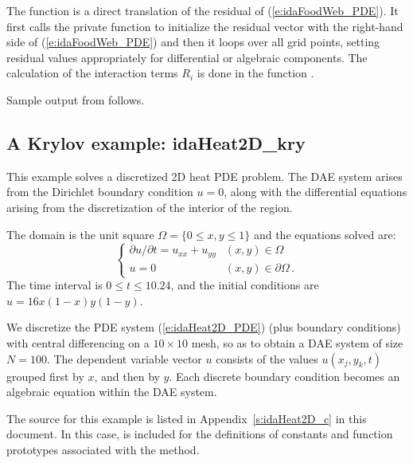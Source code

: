 The function  is a direct translation of the residual of
(\ref{e:idaFoodWeb_PDE}).  It first calls the private function  to
initialize the residual vector with the right-hand side of (\ref{e:idaFoodWeb_PDE})
and then it loops over all grid points, setting residual values appropriately for 
differential or algebraic components. The calculation of the interaction terms
$R_i$ is done in the function .


Sample output from  follows.


\subsection{A Krylov example: idaHeat2D\_kry}\label{ss:idaHeat2D}

This example solves a discretized 2D heat PDE problem. The DAE system
arises from the Dirichlet boundary condition $u = 0$, along with the 
differential equations arising from the discretization of the interior 
of the region. 

The domain is the unit square $\Omega = \{ 0 \le x,y \le 1 \}$ and the
equations solved are:
\begin{equation}\label{e:idaHeat2D_PDE}
\begin{cases}
  \partial u / \partial t = u_{xx} + u_{yy}  & (x,y) \in \Omega \\
  u = 0 & (x,y) \in \partial\Omega\, .
\end{cases}
\end{equation}
The time interval is $0 \leq t \leq 10.24$, and the initial conditions are 
$u = 16x(1-x)y(1-y)$.

We discretize the PDE system (\ref{e:idaHeat2D_PDE}) (plus boundary conditions)
with central differencing on a $10 \times 10$ mesh, so as to obtain a
DAE system of size $N = 100$.  The dependent variable vector $u$
consists of the values $u(x_j,y_k,t)$ grouped first by $x$, and then
by $y$.  Each discrete boundary condition becomes an algebraic equation
within the DAE system.

The source for this example is listed in Appendix~\ref{s:idaHeat2D_c} in this
document. In this case,  is included for the definitions of
constants and function prototypes associated with the {\spgmr} method.

